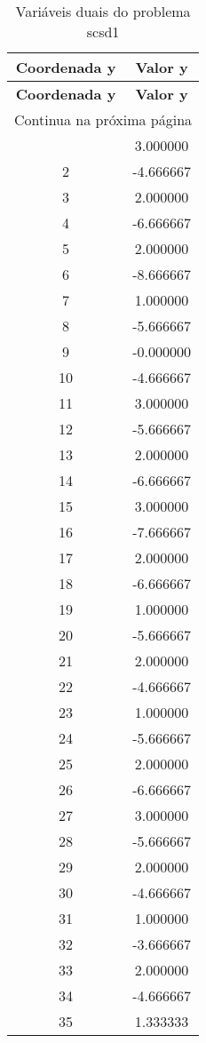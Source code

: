 \documentclass[12pt]{article}
\begin{document}
\begin{longtable}{@{}cc@{}}
\caption{Variáveis duais do problema scsd1} \\
\toprule
\textbf{Coordenada y} & \textbf{Valor y} \\
\midrule
\endfirsthead

\toprule
\textbf{Coordenada y} & \textbf{Valor y} \\
\midrule
\endhead

\midrule \multicolumn{2}{r}{{Continua na próxima página}} \\ \midrule
\endfoot

\bottomrule
\endlastfoot
1 & 3.000000 \\
2 & -4.666667 \\
3 & 2.000000 \\
4 & -6.666667 \\
5 & 2.000000 \\
6 & -8.666667 \\
7 & 1.000000 \\
8 & -5.666667 \\
9 & -0.000000 \\
10 & -4.666667 \\
11 & 3.000000 \\
12 & -5.666667 \\
13 & 2.000000 \\
14 & -6.666667 \\
15 & 3.000000 \\
16 & -7.666667 \\
17 & 2.000000 \\
18 & -6.666667 \\
19 & 1.000000 \\
20 & -5.666667 \\
21 & 2.000000 \\
22 & -4.666667 \\
23 & 1.000000 \\
24 & -5.666667 \\
25 & 2.000000 \\
26 & -6.666667 \\
27 & 3.000000 \\
28 & -5.666667 \\
29 & 2.000000 \\
30 & -4.666667 \\
31 & 1.000000 \\
32 & -3.666667 \\
33 & 2.000000 \\
34 & -4.666667 \\
35 & 1.333333 \\

\end{longtable}
\end{document}
